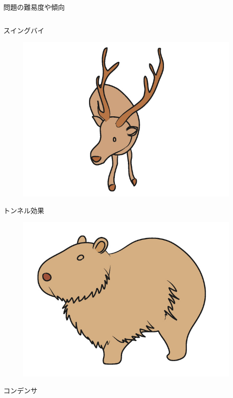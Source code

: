 \documentclass[dvipdfmx]{beamer}
\newenvironment{wideitemize}{\itemize\setlength{\itemsep}{1em}}{\enditemize}
\begin{document}
\begin{frame}{問題の難易度や傾向}
\begin{columns}[t]
\begin{column}{0.5\textwidth}
\begin{wideitemize}
\begin{figure}[htbp]
\end{figure}
\item[3.] スイングバイ
\begin{figure}[htbp]
    \centering
    \includegraphics[bb=0 0 6.4 4.8, scale=0.08]{img/a03.jpg}
\end{figure}
\item[4.] トンネル効果
\begin{figure}[htbp]
    \centering
    \includegraphics[bb=0 0 6.4 4.8, scale=0.07]{img/a04.jpg}
\end{figure}
\item[5.] コンデンサ
\begin{figure}[htbp]
    \centering

\end{figure}
\end{wideitemize}
\end{column}
\end{columns}
\end{frame}
\end{document}
